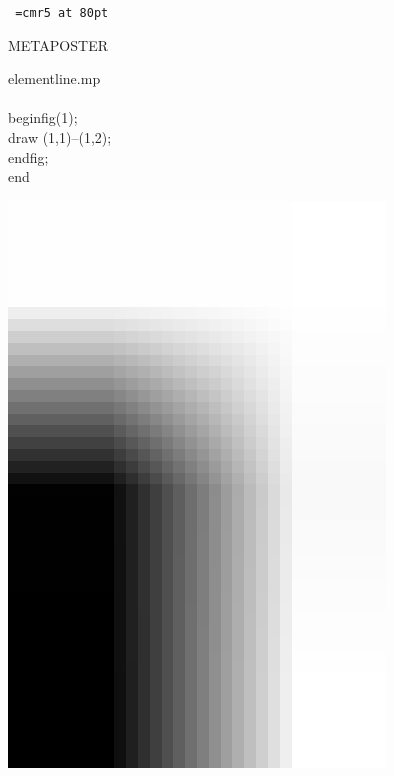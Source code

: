 \documentclass[a4paper]{report}
\begin{document}
\pagestyle{empty}
\tt       %
\font\tinyfont=cmr5 at 80pt

\scriptsize

\noindent 
 \begin{center}
\tinyfont
METAPOSTER
\end{center}
\vspace{.5cm}

\noindent
\begin{multicols*}{2}
\addtolength{\linewidth}{1in}

elementline.mp\\
\\
beginfig(1);\\
draw (1,1)--(1,2);\\
endfig;\\
end\\


\vfill
\columnbreak

\includegraphics[width=10cm]{elements/elementline}

\end{multicols*}
\noindent
\end{document}
